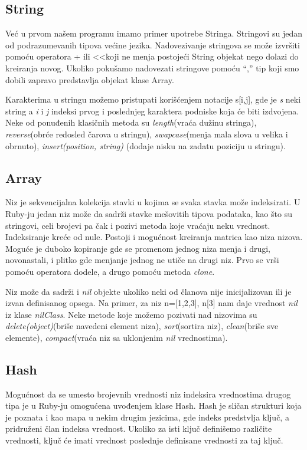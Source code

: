 \documentclass[a4paper]{article}
\begin{document}
\subsection{String}
Već u prvom našem programu imamo primer upotrebe Stringa.  Stringovi su jedan od podrazumevanih tipova većine jezika. Nadovezivanje stringova se može izvršiti pomoću operatora + ili \textless\textless    koji ne menja postojeći String objekat nego dolazi do kreiranja novog. Ukoliko pokušamo nadovezati stringove pomoću “,” tip koji smo dobili zapravo predstavlja objekat klase Array.

Karakterima u stringu možemo pristupati korišćenjem notacije s[i,j], gde je \emph{s} neki string a \emph{i} i \emph{j} indeksi prvog i poslednjeg karaktera podniske koja će biti izdvojena. Neke od ponuđenih klasičnih metoda su \emph{length}(vraća dužinu stringa), \emph{reverse}(obrće redosled čarova u stringu), \emph{swapcase}(menja mala slova u velika i obrnuto), \emph{insert(position, string)} (dodaje nisku na zadatu poziciju u stringu).

\subsection{Array}
Niz je sekvencijalna kolekcija stavki u kojima se svaka stavka može indeksirati. U Ruby-ju jedan niz može da sadrži stavke mešovitih tipova podataka, kao što su stringovi, celi brojevi pa čak i pozivi metoda koje vraćaju neku vrednost. Indeksiranje kreće od nule. Postoji i mogućnost kreiranja matrica kao niza nizova. Moguće je duboko kopiranje gde se promenom jednog niza menja i drugi, novonastali, i plitko gde menjanje jednog ne utiče na drugi niz. Prvo se vrši pomoću operatora dodele, a drugo pomoću metoda \emph{clone}. 

Niz može da sadrži i \emph{nil} objekte ukoliko neki od članova nije inicijalizovan ili je izvan definisanog opsega. Na primer, za niz n=[1,2,3], n[3]  nam daje vrednost \emph{nil} iz klase \emph{nilClass}. Neke metode koje možemo pozivati nad nizovima su \emph{delete(object)}(briše navedeni element niza), \emph{sort}(sortira niz), \emph{clean}(briše sve elemente), \emph{compact}(vraća niz sa uklonjenim \emph{nil} vrednostima).

\subsection{Hash}
Mogućnost da se umesto brojevnih vrednosti niz indeksira vrednostima drugog tipa je u Ruby-ju omogućena uvođenjem klase Hash. Hash je sličan strukturi koja je poznata i kao mapa u nekim drugim jezicima, gde indeks predstvlja ključ, a pridruženi član indeksa vrednost. Ukoliko za isti ključ definišemo različite vrednosti, ključ  će imati vrednost poslednje definisane vrednosti za taj ključ. 
\end{document}
